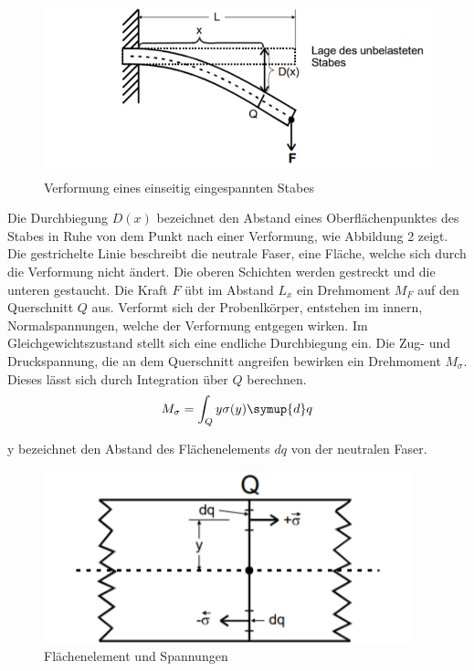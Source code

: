 \begin{figure}[H]
  \centering
  \includegraphics[height=5cm]{einseitigerstab.PNG}
  \caption{Verformung eines einseitig eingespannten Stabes}
  \label{fig:einseitigerstab}
\end{figure}

Die Durchbiegung $D(x)$ bezeichnet den Abstand eines Oberflächenpunktes des Stabes
in Ruhe von dem Punkt nach einer Verformung, wie Abbildung 2 zeigt. Die
gestrichelte Linie beschreibt die neutrale Faser, eine Fläche, welche sich durch die Verformung nicht ändert.
Die oberen Schichten werden gestreckt und die unteren gestaucht. Die Kraft $F$
übt im Abstand $L _ x$ ein Drehmoment $M_F$ auf den Querschnitt $Q$ aus. Verformt sich
der Probenlkörper, entstehen im innern, Normalspannungen, welche der Verformung
entgegen wirken. Im Gleichgewichtszustand stellt sich eine endliche Durchbiegung ein.
Die Zug- und Druckspannung, die an dem Querschnitt angreifen bewirken ein Drehmoment $M_{\sigma}$.
Dieses lässt sich durch Integration über $Q$ berechnen.
\begin{equation}
  M_{\sigma} = \int_Q y \sigma(y) \symup{d}q
\end{equation}

y bezeichnet den Abstand des Flächenelements $dq$ von der neutralen Faser.

\begin{figure}[H]
  \centering
  \includegraphics[height=5cm]{stabausschnitt.PNG}
  \caption{Flächenelement und Spannungen}
  \label{fig:stabausschnitt}
\end{figure}

